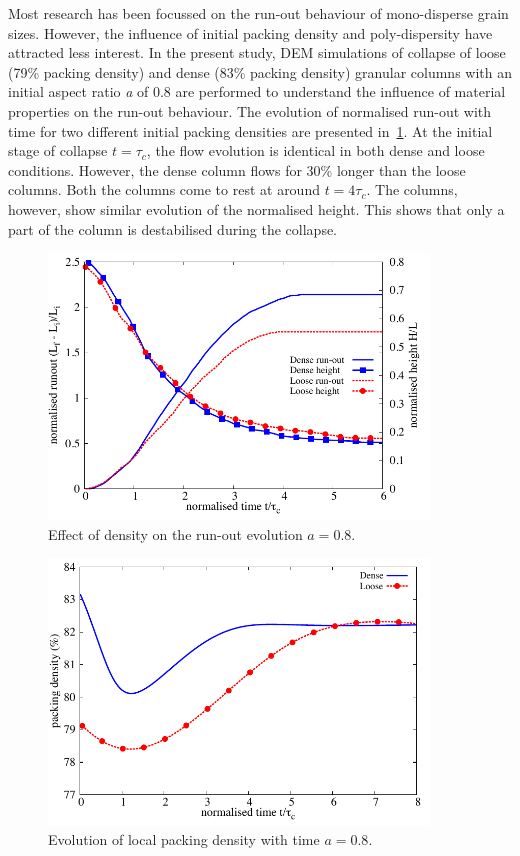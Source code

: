 Most research has been focussed on the run-out behaviour of mono-disperse 
grain sizes. However, the influence of initial packing density and 
poly-dispersity have attracted less interest. In the present study, DEM 
simulations of collapse of loose (79\% packing density) and dense (83\% 
packing density) granular columns with an initial aspect ratio \textit{a} of 
0.8 are performed to understand the influence of material properties on the 
run-out behaviour. The evolution of normalised run-out with time for two 
different initial packing densities are presented 
in~\cref{fig:runout_height_dense_r18}. At the initial 
stage of collapse $t=\tau_c$, the flow evolution is identical in both dense and 
loose conditions. However, the dense column flows for 30\% longer than the 
loose columns. Both the columns come to rest at around $t = 4\tau_c$. The 
columns, however, show similar evolution of the normalised height. This shows 
that only a part of the column is destabilised during the collapse.
\begin{figure}[htbp]
\centering
\includegraphics[width=0.9\textwidth]{runout_height_dense_r18}
\caption{Effect of density on the run-out evolution $a = 0.8$.}
\label{fig:runout_height_dense_r18}
\end{figure}

\begin{figure}[htbp]
\centering
\includegraphics[width=0.9\textwidth]{voro_r18}
\caption{Evolution of local packing density with time $a = 0.8$.}
\label{fig:voro_r18}
\end{figure}

